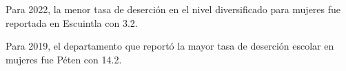 Para 2022, la menor tasa de deserción en el nivel diversificado para mujeres fue reportada en Escuintla con 3.2. 

Para 2019, el departamento que reportó la mayor tasa de deserción escolar en mujeres fue Péten con 14.2.  

